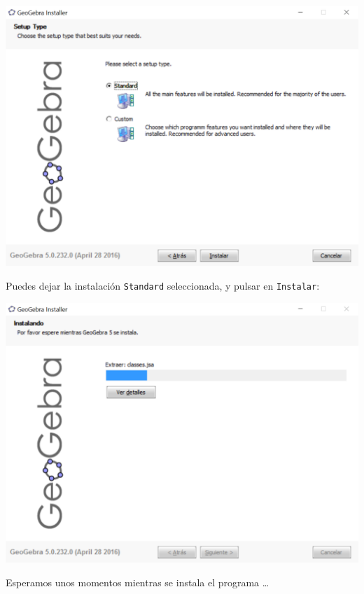 \documentclass[10pt,a4paper]{article}\usepackage[]{graphicx}\usepackage[]{color}
\begin{document}
    \begin{center}
    \includegraphics[width=14cm]{../fig/Tut00-GeoGebraSetup03-201605.png}
    \end{center}
Puedes dejar la instalación {\tt Standard} seleccionada, y pulsar en {\tt Instalar}:
    \begin{center}
    \includegraphics[width=14cm]{../fig/Tut00-GeoGebraSetup04-201605.png}
    \end{center}
Esperamos unos momentos mientras se instala el programa \ldots
\end{document}
